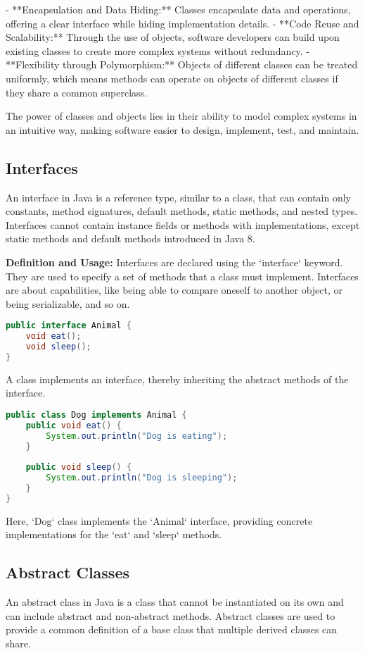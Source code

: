\documentclass{article}
\begin{document}
- **Encapsulation and Data Hiding:** Classes encapsulate data and operations, offering a clear interface while hiding implementation details.
- **Code Reuse and Scalability:** Through the use of objects, software developers can build upon existing classes to create more complex systems without redundancy.
- **Flexibility through Polymorphism:** Objects of different classes can be treated uniformly, which means methods can operate on objects of different classes if they share a common superclass.

The power of classes and objects lies in their ability to model complex systems in an intuitive way, making software easier to design, implement, test, and maintain.

\subsection{Interfaces}
An interface in Java is a reference type, similar to a class, that can contain only constants, method signatures, default methods, static methods, and nested types. Interfaces cannot contain instance fields or methods with implementations, except static methods and default methods introduced in Java 8.

\textbf{Definition and Usage:}
Interfaces are declared using the `interface` keyword. They are used to specify a set of methods that a class must implement. Interfaces are about capabilities, like being able to compare oneself to another object, or being serializable, and so on.

\begin{lstlisting}[language=Java]
public interface Animal {
    void eat();
    void sleep();
}
\end{lstlisting}

A class implements an interface, thereby inheriting the abstract methods of the interface.

\begin{lstlisting}[language=Java]
public class Dog implements Animal {
    public void eat() {
        System.out.println("Dog is eating");
    }
    
    public void sleep() {
        System.out.println("Dog is sleeping");
    }
}
\end{lstlisting}

Here, `Dog` class implements the `Animal` interface, providing concrete implementations for the `eat` and `sleep` methods.

\subsection{Abstract Classes}
An abstract class in Java is a class that cannot be instantiated on its own and can include abstract and non-abstract methods. Abstract classes are used to provide a common definition of a base class that multiple derived classes can share.
\end{document}
